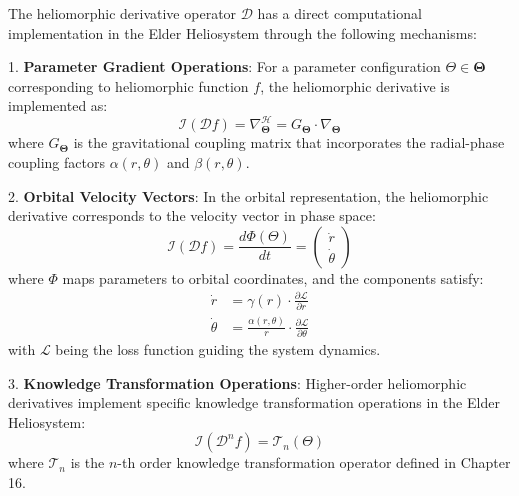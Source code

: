 \begin{theorem}
\label{thm:computational_differentiation}
The heliomorphic derivative operator $\mathcal{D}$ has a direct computational implementation in the Elder Heliosystem through the following mechanisms:

1. \textbf{Parameter Gradient Operations}: For a parameter configuration $\Theta \in \boldsymbol{\Theta}$ corresponding to heliomorphic function $f$, the heliomorphic derivative is implemented as:
\begin{equation}
\mathcal{I}(\mathcal{D}f) = \nabla_{\boldsymbol{\Theta}}^{\mathcal{H}} = G_{\boldsymbol{\Theta}} \cdot \nabla_{\boldsymbol{\Theta}}
\end{equation}
where $G_{\boldsymbol{\Theta}}$ is the gravitational coupling matrix that incorporates the radial-phase coupling factors $\alpha(r,\theta)$ and $\beta(r,\theta)$.

2. \textbf{Orbital Velocity Vectors}: In the orbital representation, the heliomorphic derivative corresponds to the velocity vector in phase space:
\begin{equation}
\mathcal{I}(\mathcal{D}f) = \frac{d\Phi(\Theta)}{dt} = \begin{pmatrix} \dot{r} \\ \dot{\theta} \end{pmatrix}
\end{equation}
where $\Phi$ maps parameters to orbital coordinates, and the components satisfy:
\begin{align}
\dot{r} &= \gamma(r) \cdot \frac{\partial \mathcal{L}}{\partial r}\\
\dot{\theta} &= \frac{\alpha(r,\theta)}{r} \cdot \frac{\partial \mathcal{L}}{\partial \theta}
\end{align}
with $\mathcal{L}$ being the loss function guiding the system dynamics.

3. \textbf{Knowledge Transformation Operations}: Higher-order heliomorphic derivatives implement specific knowledge transformation operations in the Elder Heliosystem:
\begin{equation}
\mathcal{I}(\mathcal{D}^nf) = \mathcal{T}_n(\Theta)
\end{equation}
where $\mathcal{T}_n$ is the $n$-th order knowledge transformation operator defined in Chapter 16.
\end{theorem}

